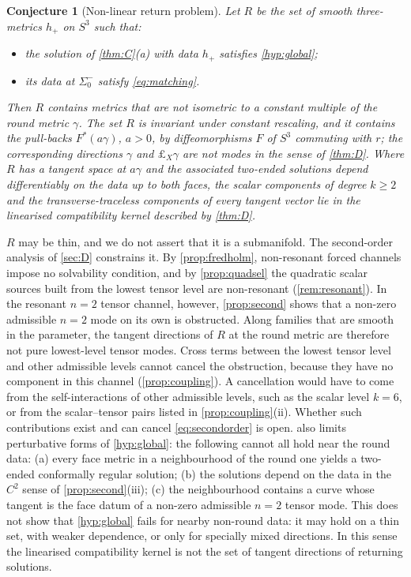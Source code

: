 \documentclass[11pt]{article}
\theoremstyle{canonmath}
\theoremstyle{canonpostulate}
\theoremstyle{canonproposition}
\theoremstyle{canonmath}
\theoremstyle{canonproposition}
\newtheorem{conjecture}{Conjecture}[section]
\def\mathcal#1{#1}%
\begin{document}
\begin{conjecture}[Non-linear return problem]\label{conj:nonlinear}
Let $\mathcal{R}$ be the set of smooth three-metrics $h_+$ on $S^3$ such that:
\begin{itemize}
\item the solution of \cref{thm:C}(a) with data $h_+$ satisfies \ref{hyp:global};
\item its data at $\Sigma_0^-$ satisfy \eqref{eq:matching}.
\end{itemize}
Then $\mathcal{R}$ contains metrics that are not isometric to a constant multiple of the round metric $\gamma$. The set $\mathcal{R}$ is invariant under constant rescaling, and it contains the pull-backs $F^*(a\gamma)$, $a>0$, by diffeomorphisms $F$ of $S^3$ commuting with $r$; the corresponding directions $\gamma$ and $\pounds_X\gamma$ are not modes in the sense of \cref{thm:D}. Where $\mathcal{R}$ has a tangent space at $a\gamma$ and the associated two-ended solutions depend differentiably on the data up to both faces, the scalar components of degree $k\ge2$ and the transverse-traceless components of every tangent vector lie in the linearised compatibility kernel described by \cref{thm:D}.
\end{conjecture}

$\mathcal{R}$ may be thin, and we do not assert that it is a submanifold. The second-order analysis of \cref{sec:D} constrains it. By \cref{prop:fredholm}, non-resonant forced channels impose no solvability condition, and by \cref{prop:quadsel} the quadratic scalar sources built from the lowest tensor level are non-resonant (\cref{rem:resonant}). In the resonant $n=2$ tensor channel, however, \cref{prop:second} shows that a non-zero admissible $n=2$ mode on its own is obstructed. Along families that are smooth in the parameter, the tangent directions of $\mathcal R$ at the round metric are therefore not pure lowest-level tensor modes. Cross terms between the lowest tensor level and other admissible levels cannot cancel the obstruction, because they have no component in this channel (\cref{prop:coupling}). A cancellation would have to come from the self-interactions of other admissible levels, such as the scalar level $k=6$, or from the scalar--tensor pairs listed in \cref{prop:coupling}(ii). Whether such contributions exist and can cancel \eqref{eq:secondorder} is open.  also limits perturbative forms of \ref{hyp:global}: the following cannot all hold near the round data: (a) every face metric in a neighbourhood of the round one yields a two-ended conformally regular solution; (b) the solutions depend on the data in the $C^2$ sense of \cref{prop:second}(iii); (c) the neighbourhood contains a curve whose tangent is the face datum of a non-zero admissible $n=2$ tensor mode. This does not show that \ref{hyp:global} fails for nearby non-round data: it may hold on a thin set, with weaker dependence, or only for specially mixed directions. In this sense the linearised compatibility kernel is not the set of tangent directions of returning solutions.
\end{document}
